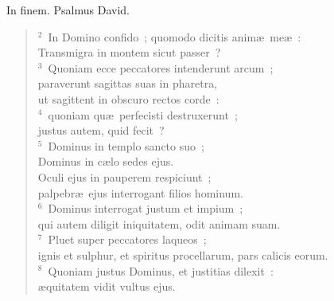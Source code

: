 \lettrine[lines=3,image=true,loversize=0.05,lraise=-0.03]{I}{}n finem. Psalmus David.
\begin{flushleft}\begin{verse}\vspace{6pt}${}^{2}$~In Domino confido~; quomodo dicitis anim\ae\ me\ae~:\\ Transmigra in montem sicut passer~?\\
${}^{3}$~Quoniam ecce peccatores intenderunt arcum~;\\ paraverunt sagittas suas in pharetra,\\ ut sagittent in obscuro rectos corde~:\\
${}^{4}$~quoniam qu\ae\ perfecisti destruxerunt~;\\ justus autem, quid fecit~?\\
${}^{5}$~Dominus in templo sancto suo~;\\ Dominus in c\ae lo sedes ejus.\\ Oculi ejus in pauperem respiciunt~;\\ palpebr\ae\ ejus interrogant filios hominum.\\
${}^{6}$~Dominus interrogat justum et impium~;\\ qui autem diligit iniquitatem, odit animam suam.\\
${}^{7}$~Pluet super peccatores laqueos~;\\ ignis et sulphur, et spiritus procellarum, pars calicis eorum.\\
${}^{8}$~Quoniam justus Dominus, et justitias dilexit~:\\ \ae quitatem vidit vultus ejus.\end{verse}\end{flushleft}



